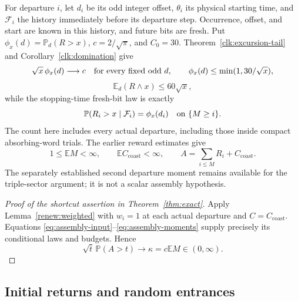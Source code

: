\documentclass[11pt]{amsart}
\theoremstyle{definition}
\theoremstyle{remark}
\newcommand{\E}{\mathbb E}
\newcommand{\PP}{\mathbb P}
\begin{document}
For departure $i$, let $d_i$ be its odd integer offset, $\theta_i$ its
physical starting time, and $\mathcal F_i$ the history immediately
before its departure step. Occurrence, offset, and start are known in
this history, and future bits are fresh. Put
$\phi_x(d)=\PP_d(R>x)$, $c=2/\sqrt\pi$, and $C_0=30$.
Theorem~\ref{clk:excursion-tail} and Corollary~\ref{clk:domination} give
\begin{equation}\label{eq:assembly-input}
 \sqrt x\,\phi_x(d)\longrightarrow c\quad\hbox{for every fixed odd }d,
 \qquad \phi_x(d)\le\min(1,30/\sqrt x),
\end{equation}
\begin{equation}\label{eq:truncated-excursion}
 \E_d(R\wedge x)\le60\sqrt x,
\end{equation}
while the stopping-time fresh-bit law is exactly
\begin{equation}\label{eq:departure-conditioning}
 \PP(R_i>x\mid\mathcal F_i)=\phi_x(d_i)
                       \quad\hbox{on }\{M\ge i\}.
\end{equation}
The count here includes every actual departure, including those inside
compact absorbing-word trials. The earlier reward estimates give
\begin{equation}\label{eq:assembly-moments}
 1\le\E M<\infty,\qquad \E C_{\mathrm{coast}}<\infty,\qquad
 A=\sum_{i\le M}R_i+C_{\mathrm{coast}}.
\end{equation}
The separately established second departure moment remains available
for the triple-sector argument; it is not a scalar assembly hypothesis.

\begin{proof}[Proof of the shortcut assertion in Theorem~\ref{thm:exact}]
Apply Lemma~\ref{renew:weighted} with $w_i=1$ at each actual departure
and $C=C_{\mathrm{coast}}$. Equations
\eqref{eq:assembly-input}--\eqref{eq:assembly-moments} supply precisely
its conditional laws and budgets. Hence
\begin{equation}\label{eq:assembly-lower}
 \sqrt t\,\PP(A>t)\longrightarrow\kappa=c\E M\in(0,\infty).
\end{equation}
\end{proof}

\subsection{Initial returns and random entrances}
\end{document}
